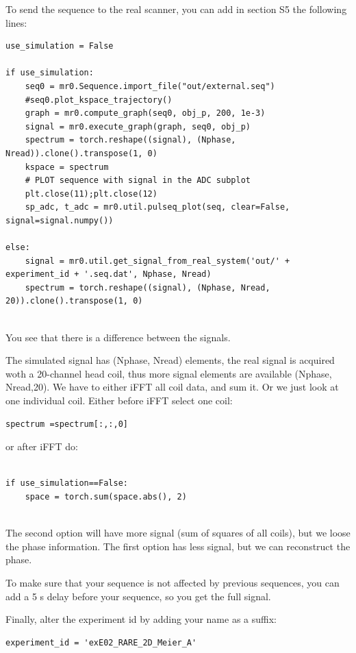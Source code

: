\documentclass[a4paper,12pt]{extarticle}
\begin{document}
To send the sequence to the real scanner, you can add in section S5 the following lines:
\begin{verbatim}
use_simulation = False

if use_simulation:
    seq0 = mr0.Sequence.import_file("out/external.seq")
    #seq0.plot_kspace_trajectory()
    graph = mr0.compute_graph(seq0, obj_p, 200, 1e-3)
    signal = mr0.execute_graph(graph, seq0, obj_p)
    spectrum = torch.reshape((signal), (Nphase, Nread)).clone().transpose(1, 0)
    kspace = spectrum
    # PLOT sequence with signal in the ADC subplot
    plt.close(11);plt.close(12)
    sp_adc, t_adc = mr0.util.pulseq_plot(seq, clear=False, signal=signal.numpy())

else:
    signal = mr0.util.get_signal_from_real_system('out/' + experiment_id + '.seq.dat', Nphase, Nread)
    spectrum = torch.reshape((signal), (Nphase, Nread, 20)).clone().transpose(1, 0)
    
\end{verbatim}

You see that there is a difference between the signals.

The simulated signal has (Nphase, Nread) elements, the real signal is acquired woth a 20-channel head coil, thus more signal elements are available (Nphase, Nread,20). 
We have to either iFFT all coil data, and sum it. Or we just look at one individual coil.
Either before iFFT select one coil:
\begin{verbatim}
spectrum =spectrum[:,:,0]
\end{verbatim}
or after iFFT do:
\begin{verbatim}

if use_simulation==False:
    space = torch.sum(space.abs(), 2)
    
\end{verbatim}
The second option will have more signal (sum of squares of all coils), but we loose the phase information.
The first option has less signal, but we can reconstruct the phase.

To make sure that your sequence is not affected by previous sequences, you can add a 5 s delay before your sequence, so you get the full signal.

Finally, alter the experiment id  by adding your name as a suffix:
\begin{verbatim}
experiment_id = 'exE02_RARE_2D_Meier_A'
\end{verbatim}
\end{document}

